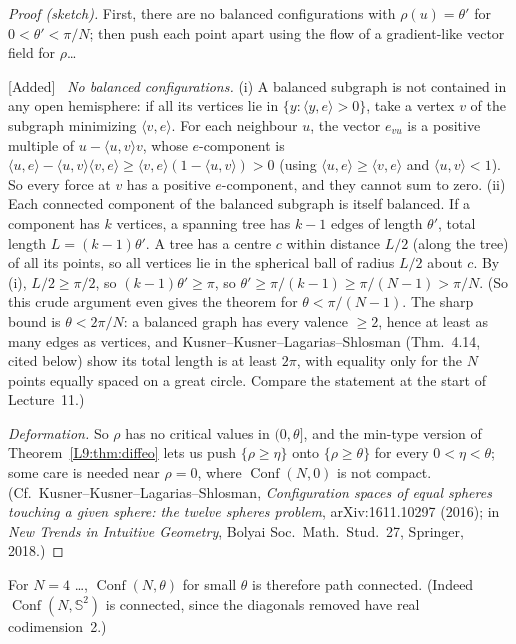 \documentclass[11pt,openany]{book}
\theoremstyle{plain}
\theoremstyle{definition}
\theoremstyle{remark}
\newcommand{\added}[1]{{\color{addcol}#1}}
\newcommand{\unclear}[1]{\marginpar{\raggedright\scriptsize\color{flagcol}\textbf{?} #1}}
\newenvironment{addedblock}{\par\color{addcol}\noindent\textsf{\small[Added]}\ }{\par}
\newcommand{\Sph}{\mathbb{S}}          %
\newcommand{\Conf}{\operatorname{Conf}}
\begin{document}
\begin{proof}[Proof (sketch)]
First, there are no balanced configurations \added{with $\rho(u)=\theta'$ for $0<\theta'<\pi/N$};
then push each point apart \added{using the flow of a gradient-like vector field for $\rho$}\dots
\begin{addedblock}
\emph{No balanced configurations.} (i) A balanced subgraph is not contained in any open hemisphere:
if all its vertices lie in $\{y:\langle y,e\rangle>0\}$, take a vertex $v$ of the subgraph minimizing
$\langle v,e\rangle$. For each neighbour $u$, the vector $e_{vu}$ is a positive multiple of
$u-\langle u,v\rangle v$, whose $e$-component is $\langle u,e\rangle-\langle u,v\rangle\langle v,e\rangle
\ge\langle v,e\rangle(1-\langle u,v\rangle)>0$ (using $\langle u,e\rangle\ge\langle v,e\rangle$ and $\langle u,v\rangle<1$). So every force at $v$ has a positive $e$-component,
and they cannot sum to zero.
(ii) Each connected component of the balanced subgraph is itself balanced. If a component has $k$
vertices, a spanning tree has $k-1$ edges of length $\theta'$, total length $L=(k-1)\theta'$. A tree
has a centre $c$ within distance $L/2$ (along the tree) of all its points, so all vertices lie in the
spherical ball of radius $L/2$ about $c$. By (i), $L/2\ge\pi/2$, so $(k-1)\theta'\ge\pi$, so
$\theta'\ge\pi/(k-1)\ge\pi/(N-1)>\pi/N$.
(So this crude argument even gives the theorem for $\theta<\pi/(N-1)$. The sharp bound is
$\theta<2\pi/N$: a balanced graph has every valence $\ge2$, hence at least as many edges as
vertices, and Kusner--Kusner--Lagarias--Shlosman (Thm.~4.14, cited below) show its total length is at least
$2\pi$, with equality only for the $N$ points equally spaced on a great circle. Compare the
statement at the start of Lecture~11.)

\emph{Deformation.} So $\rho$ has no critical values in $(0,\theta]$, and the min-type version of
Theorem~\ref{L9:thm:diffeo} lets us push $\{\rho\ge\eta\}$ onto $\{\rho\ge\theta\}$ for every
$0<\eta<\theta$; some care is needed near $\rho=0$, where $\Conf(N,0)$ is not compact. (Cf.\
Kusner--Kusner--Lagarias--Shlosman, \emph{Configuration spaces of equal spheres touching a given
sphere: the twelve spheres problem}, arXiv:1611.10297 (2016); in \emph{New Trends in Intuitive
Geometry}, Bolyai Soc.\ Math.\ Stud.\ 27, Springer, 2018.)
\end{addedblock}
\end{proof}

For $N=4$ \dots, $\Conf(N,\theta)$ for small $\theta$ is therefore path connected.
\unclear{``$N=4$'' or ``$N>4$''}
\added{(Indeed $\Conf(N,\Sph^2)$ is connected, since the diagonals removed have real codimension~2.)}
\end{document}

